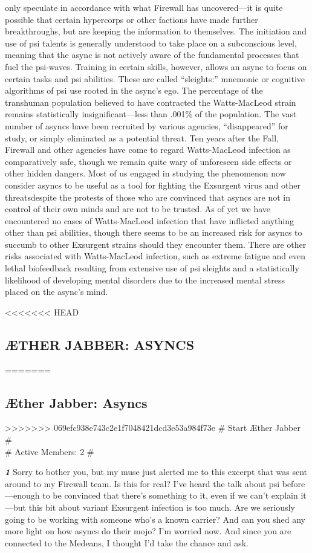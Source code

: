 only speculate in accordance with what
Firewall has uncovered—it is quite possible
that certain hypercorps or other factions
have made further breakthroughs,
but are keeping the information to
themselves.
The initiation and use of psi talents
is generally understood to take place on
a subconscious level, meaning that the
async is not actively aware of the fundamental
processes that fuel the psi-waves.
Training in certain skills, however, allows
an async to focus on certain tasks and
psi abilities. These are called “sleights:”
mnemonic or cognitive algorithms of psi
use rooted in the async’s ego.
The percentage of the transhuman
population believed to have contracted
the Watts-MacLeod strain remains statistically
insignificant—less than .001\%
of the population. The vast number of
asyncs have been recruited by various
agencies, “disappeared” for study, or
simply eliminated as a potential threat.
Ten years after the Fall, Firewall and
other agencies have come to regard
Watts-MacLeod infection as comparatively
safe, though we remain quite
wary of unforeseen side effects or other
hidden dangers. Most of us engaged in
studying the phenomenon now consider
asyncs to be useful as a tool for fighting
the Exsurgent virus and other threatsdespite the protests of those who are
convinced that asyncs are not in control
of their own minds and are not to be
trusted. As of yet we have encountered
no cases of Watts-MacLeod infection
that have inflicted anything other than
psi abilities, though there seems to be
an increased risk for asyncs to succumb
to other Exsurgent strains should they
encounter them. There are other risks associated
with Watts-MacLeod infection,
such as extreme fatigue and even lethal
biofeedback resulting from extensive use
of psi sleights and a statistically likelihood
of developing mental disorders due
to the increased mental stress placed on
the async’s mind.

\newpage
<<<<<<< HEAD
\subsection{ÆTHER JABBER: ASYNCS}
=======
\subsection{Æther Jabber: Asyncs}
>>>>>>> 069efc938e743c2e1f7048421dcd3e53a984f73e
\# Start Æther Jabber \# \\
\# Active Members: 2 \#

\textbf{\textit{1}} Sorry to bother you, but my muse just
alerted me to this excerpt that was
sent around to my Firewall team. Is
this for real? I’ve heard the talk about
psi before—enough to be convinced
that there’s something to it, even
if we can’t explain it—but this bit
about variant Exsurgent infection is
too much. Are we seriously going to
be working with someone who’s a
known carrier? And can you shed any
more light on how asyncs do their
mojo? I’m worried now. And since
you are connected to the Medeans, I
thought I’d take the chance and ask.

